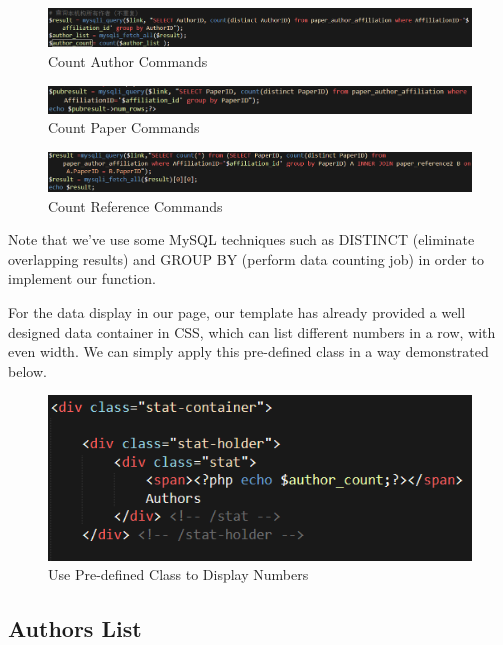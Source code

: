 \documentclass{book}
\begin{document}
\begin{figure}[H]
\centering
\includegraphics[scale=0.55]{img/zlt_aff_authorcount.png}
\caption{Count Author Commands}
\label{fig:aff_authorcount}
\end{figure}
\begin{figure}[H]
\centering
\includegraphics[scale=0.6]{img/zlt_aff_papercount.png}
\caption{Count Paper Commands}
\label{fig:aff_papercount}
\end{figure}
\begin{figure}[H]
\centering
\includegraphics[scale=0.55]{img/zlt_aff_refcount.png}
\caption{Count Reference Commands}
\label{fig:aff_refcount}
\end{figure}

Note that we've use some MySQL techniques such as DISTINCT (eliminate overlapping results) and GROUP BY (perform data counting job) in order to implement our function.

For the data display in our page, our template has already provided a well designed data container in CSS, which can list different numbers in a row, with even width. We can simply apply this pre-defined class in a way demonstrated below.

\begin{figure}[H]
\centering
\includegraphics[scale=0.8]{img/zlt_aff_countdisplay.png}
\caption{Use Pre-defined Class to Display Numbers}
\end{figure}


\subsection{Authors List}
\end{document}
